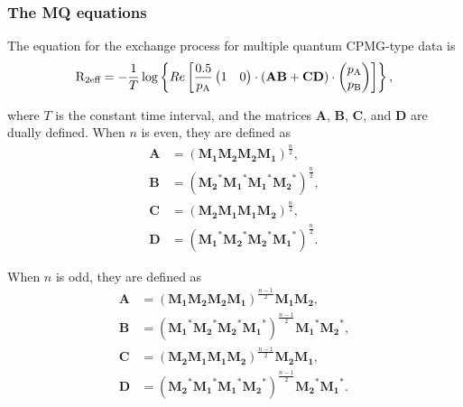 \subsubsection{The MQ equations}

The equation for the exchange process for multiple quantum CPMG-type data is 
\begin{equation}
    \mathrm{R}_\textrm{2eff} = - \frac{1}{T}
                 \log \left\{ Re \left[ \frac{0.5}{p_\textrm{A}}
                     \begin{pmatrix}1&0\end{pmatrix} \cdot \left( \mathbf{AB} + \mathbf{CD} \right) \cdot \begin{pmatrix}p_\textrm{A}\\p_\textrm{B}\end{pmatrix}
                 \right] \right\},
\end{equation}

where $T$ is the constant time interval, and the matrices $\mathbf{A}$, $\mathbf{B}$, $\mathbf{C}$, and $\mathbf{D}$ are dually defined.
When $n$ is even, they are defined as 
\begin{subequations}
\begin{align}
    \mathbf{A} &= \left( \mathbf{M_1} \mathbf{M_2} \mathbf{M_2} \mathbf{M_1} \right)^{\frac{n}{2}}, \\
    \mathbf{B} &= \left( \mathbf{M_2}^* \mathbf{M_1}^* \mathbf{M_1}^* \mathbf{M_2}^* \right)^{\frac{n}{2}}, \\
    \mathbf{C} &= \left( \mathbf{M_2} \mathbf{M_1} \mathbf{M_1} \mathbf{M_2} \right)^{\frac{n}{2}}, \\
    \mathbf{D} &= \left( \mathbf{M_1}^* \mathbf{M_2}^* \mathbf{M_2}^* \mathbf{M_1}^* \right)^{\frac{n}{2}}.
\end{align}
\end{subequations}

When $n$ is odd, they are defined as
\begin{subequations}
\begin{align}
    \mathbf{A} &= \left( \mathbf{M_1} \mathbf{M_2} \mathbf{M_2} \mathbf{M_1} \right)^{\frac{n-1}{2}} \mathbf{M_1} \mathbf{M_2}, \\
    \mathbf{B} &= \left( \mathbf{M_1}^* \mathbf{M_2}^* \mathbf{M_2}^* \mathbf{M_1}^* \right)^{\frac{n-1}{2}} \mathbf{M_1}^* \mathbf{M_2}^*, \\
    \mathbf{C} &= \left( \mathbf{M_2} \mathbf{M_1} \mathbf{M_1} \mathbf{M_2} \right)^{\frac{n-1}{2}} \mathbf{M_2} \mathbf{M_1}, \\
    \mathbf{D} &= \left( \mathbf{M_2}^* \mathbf{M_1}^* \mathbf{M_1}^* \mathbf{M_2}^* \right)^{\frac{n-1}{2}} \mathbf{M_2}^* \mathbf{M_1}^*.
\end{align}
\end{subequations}

